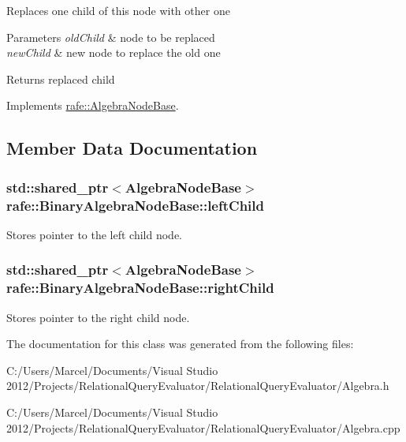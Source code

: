 Replaces one child of this node with other one 
\begin{DoxyParams}{Parameters}
{\em old\+Child} & node to be replaced \\
\hline
{\em new\+Child} & new node to replace the old one \\
\hline
\end{DoxyParams}
\begin{DoxyReturn}{Returns}
replaced child 
\end{DoxyReturn}


Implements \hyperlink{classrafe_1_1_algebra_node_base_ac6d722e739dd39c223bb129dfbd0ab45}{rafe\+::\+Algebra\+Node\+Base}.



\subsection{Member Data Documentation}
\hypertarget{classrafe_1_1_binary_algebra_node_base_af7380a182bdb21a519f3dd31ae189782}{
\subsubsection[{left\+Child}]{\setlength{\rightskip}{0pt plus 5cm}std\+::shared\+\_\+ptr$<${\bf Algebra\+Node\+Base}$>$ rafe\+::\+Binary\+Algebra\+Node\+Base\+::left\+Child}}\label{classrafe_1_1_binary_algebra_node_base_af7380a182bdb21a519f3dd31ae189782}
Stores pointer to the left child node. \hypertarget{classrafe_1_1_binary_algebra_node_base_a147cbdd038dcd2f2fc5240e4594b3597}{
\subsubsection[{right\+Child}]{\setlength{\rightskip}{0pt plus 5cm}std\+::shared\+\_\+ptr$<${\bf Algebra\+Node\+Base}$>$ rafe\+::\+Binary\+Algebra\+Node\+Base\+::right\+Child}}\label{classrafe_1_1_binary_algebra_node_base_a147cbdd038dcd2f2fc5240e4594b3597}
Stores pointer to the right child node. 

The documentation for this class was generated from the following files\+:\begin{DoxyCompactItemize}
\item 
C\+:/\+Users/\+Marcel/\+Documents/\+Visual Studio 2012/\+Projects/\+Relational\+Query\+Evaluator/\+Relational\+Query\+Evaluator/Algebra.\+h\item 
C\+:/\+Users/\+Marcel/\+Documents/\+Visual Studio 2012/\+Projects/\+Relational\+Query\+Evaluator/\+Relational\+Query\+Evaluator/Algebra.\+cpp\end{DoxyCompactItemize}
